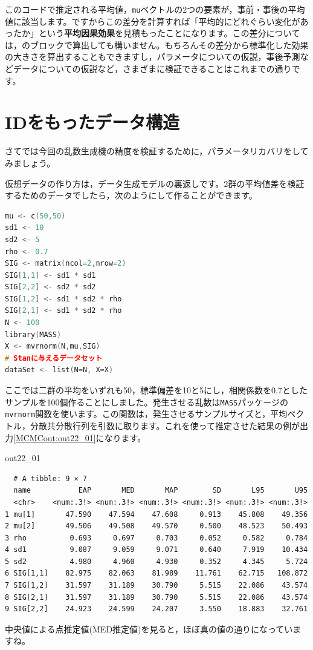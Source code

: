 \documentclass{ltjsbook}
\begin{document}
このコードで推定される平均値，\verb|mu|ベクトルの2つの要素が，事前・事後の平均値に該当します。ですからこの差分を計算すれば「平均的にどれぐらい変化があったか」という\textbf{平均因果効果}を見積もったことになります。この差分については，のブロックで算出しても構いません。もちろんその差分から標準化した効果の大きさを算出することもできますし，パラメータについての仮説，事後予測などデータについての仮説など，さまざまに検証できることはこれまでの通りです。

\section{IDをもったデータ構造}
さてでは今回の乱数生成機の精度を検証するために，パラメータリカバリをしてみましょう。

仮想データの作り方は，データ生成モデルの裏返しです。2群の平均値差を検証するためのデータでしたら，次のようにして作ることができます。

\begin{lstlisting}[language=c++,label={code:22_03},caption={対応ある二群の仮想データ}]
mu <- c(50,50)
sd1 <- 10
sd2 <- 5
rho <- 0.7
SIG <- matrix(ncol=2,nrow=2)
SIG[1,1] <- sd1 * sd1
SIG[2,2] <- sd2 * sd2
SIG[1,2] <- sd1 * sd2 * rho
SIG[2,1] <- sd1 * sd2 * rho
N <- 100
library(MASS)
X <- mvrnorm(N,mu,SIG)
# Stanに与えるデータセット
dataSet <- list(N=N, X=X)
\end{lstlisting}
ここでは二群の平均をいずれも50，標準偏差を10と5にし，相関係数を0.7としたサンプルを100個作ることにしました。発生させる乱数は\verb|MASS|パッケージの\verb|mvrnorm|関数を使います。この関数は，発生させるサンプルサイズと，平均ベクトル，分散共分散行列を引数に取ります。これを使って推定させた結果の例が出力\ref{MCMCout:out22_01}になります。

\begin{MCMCout}{}{out22_01}
	\begin{verbatim}
  # A tibble: 9 × 7
  name           EAP       MED       MAP        SD       L95       U95
  <chr>    <num:.3!> <num:.3!> <num:.3!> <num:.3!> <num:.3!> <num:.3!>
1 mu[1]       47.590    47.594    47.608     0.913    45.808    49.356
2 mu[2]       49.506    49.508    49.570     0.500    48.523    50.493
3 rho          0.693     0.697     0.703     0.052     0.582     0.784
4 sd1          9.087     9.059     9.071     0.640     7.919    10.434
5 sd2          4.980     4.960     4.930     0.352     4.345     5.724
6 SIG[1,1]    82.975    82.063    81.989    11.761    62.715   108.872
7 SIG[1,2]    31.597    31.189    30.790     5.515    22.086    43.574
8 SIG[2,1]    31.597    31.189    30.790     5.515    22.086    43.574
9 SIG[2,2]    24.923    24.599    24.207     3.550    18.883    32.761
\end{verbatim}
\end{MCMCout}
中央値による点推定値(MED推定値)を見ると，ほぼ真の値の通りになっていますね。
\end{document}
